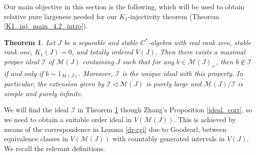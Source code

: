 \documentclass[reqno]{amsart}
\newtheorem{thm}{Theorem}[section]
\theoremstyle{definition}
\theoremstyle{remark}
\numberwithin{equation}{section}
\theoremstyle{definition}
\newcommand{\calM}{\mathcal{M}}
\newcommand{\calK}{\mathcal{K}}
\newcommand{\calI}{\mathcal{I}}
\begin{document}


Our main objective in this section is the following, which will be used to obtain relative pure largeness needed for our $K_1$-injectivity theorem (Theorem \ref{K1_inj_main_4.2_intro}).  

\begin{thm} \label{posi_ideal} 
Let $J$ be a separable and stable $C^*$-algebra with real rank zero, stable rank one, $K_{1}(J) = 0$, and totally ordered $V(J)$. Then there exists a maximal proper ideal $\calI$ of $\calM(J)$ containing $J$ such that for any $b\in \calM(J)_{+}$, then $b\notin \calI$ if and only if $b\sim 1_{\calM(J)}$. Moreover, $\calI$ is the unique ideal with this property. In particular, the extension given by $\calI\lhd \calM(J)$ is purely large and $\calM(J) / \calI$ is simple and purely infinite. 
\end{thm} 

We will find the ideal $\mathcal I$ in Theorem \ref{posi_ideal} though Zhang's Proposition \ref{ideal_corr}, so we need to obtain a suitable order ideal in $V(\calM(J))$. This is achieved by means of the correspondence in Lemma \ref{dr-cgi} due to Goodearl, between equivalence classes in $V(\calM(J))$ with countably generated intervals in $V(J)$.  We recall the relevant definitions. 
\end{document}
